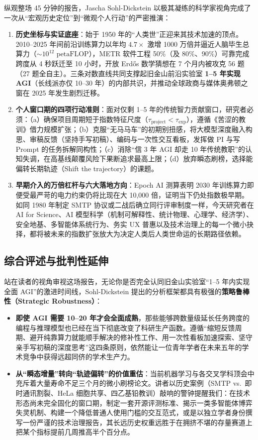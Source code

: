 \documentclass[a4paper]{article}
\begin{document}
纵观整场 45 分钟的报告，Jascha Sohl-Dickstein 以极其凝练的科学家视角完成了一次从“宏观历史定位”到“微观个人行动”的严密推演：
\begin{enumerate}
    \item \textbf{历史坐标与实证底座}：始于 1950 年的“人类世”正迎来其技术加速的顶点。2010--2025 年间前沿训练算力以年均 $4.7\times$ 激增 1000 万倍并逼近人脑毕生总算力（$\sim 10^{12}\text{ petaFLOP}$），METR 软件工程 50\%（及 80\%、90\%）可靠完成跨度从 4 秒跃迁至 10 小时，开放 Erdős 数学猜想在 7 个月内被攻克 56 题（27 题全自主）。三条对数直线共同支撑起旧金山前沿实验室 \textbf{1--5 年实现 AGI}（长线派亦仅 10--30 年）的内部共识，并推动全球政商与媒体奥弗顿之窗在 2025 年发生剧烈迁移。
    \item \textbf{个人窗口期的四项行动准则}：面对仅剩 1--5 年的传统智力贡献窗口，研究者必须：（a）确保项目周期短于指数特征尺度（$\tau_{\text{project}} < \tau_{\text{exp}}$），遵循《苦涩的教训》借力规模扩张；（b）克服“无马马车”的初期别扭感，将大模型深度融入构思、审稿反馈（坚持手写初稿）、编码与一次性交互看板，发挥做 PI 与写 Prompt 的任务拆解同构性；（c）消除“信 3 年 AGI 却走 10 年传统教职”的认知失调，在高基线颠覆风险下果断追求最高上限；（d）放弃瞬态刷榜，选择能偏转长期轨迹（Shift the trajectory）的课题。
    \item \textbf{早期介入的万倍杠杆与六大落地方向}：Epoch AI 测算表明 2030 年训练算力即便受最严苛的电力约束仍将比现在大 10,000 倍，证明当下仍处指数极早期。如同 1980 年制定 SMTP 协议或二战后确立同行评审制度一样，今天研究者在 AI for Science、AI 模型科学（机制可解释性、统计物理、心理学、经济学）、安全地基、多智能体系统行为、务实 UX 普惠以及技术治理上的每一个微小抉择，都将被未来的指数扩张放大为决定人类后人类世命运的长期路径依赖。
\end{enumerate}

\subsection{综合评述与批判性延伸}

站在读者的视角审视这场报告，无论你是否完全认同旧金山实验室“1--5 年内实现全面 AGI”的激进时间线，Sohl-Dickstein 提出的分析框架都具有极强的\textbf{策略鲁棒性（Strategic Robustness）}：
\begin{itemize}
    \item \textbf{即使 AGI 需要 10--20 年才会全面成熟}，那些能够跨数量级延长任务跨度的编程与推理模型也已经在当下彻底改变了科研生产函数。遵循“缩短反馈周期、避开纯靠算力就能顺手解决的修补性工作、用一次性看板加速探索、坚守亲手写初稿的深度思考”这四条原则，依然能让一位青年学者在未来五年的学术竞争中获得远超同侪的学术生产力。
    \item \textbf{从“瞬态增量”转向“轨迹偏转”的价值重估}：当前机器学习与各交叉学科顶会中充斥着大量寿命不足三个月的微小刷榜论文。讲者以历史案例（SMTP vs.\ 即时通讯割裂、HeLa 细胞共享、四乙基铅教训）敲响的警钟提醒我们：在技术形态尚未完全固化的窗口期，制定一套开源评测标准、揭示一类多智能体博弈失灵机制、构建一个降低普通人使用门槛的交互范式，或是以独立学者身份撰写一份严谨的技术治理报告，其长远历史权重远胜于在拥挤不堪的存量赛道上把某个指标提前几周推高半个百分点。
\end{itemize}

\end{document}
